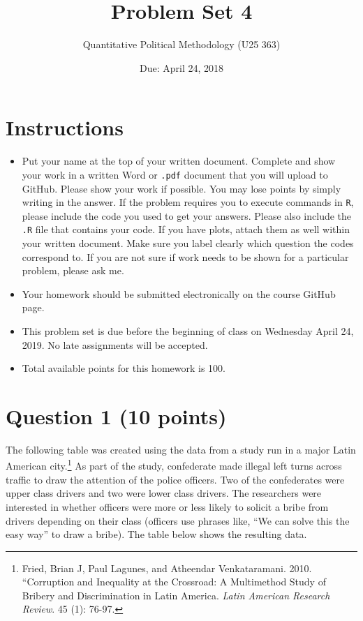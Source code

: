 \documentclass[12pt,letterpaper]{article}
\title{Problem Set 4}
\date{Due: April 24, 2018}
\author{Quantitative Political Methodology (U25 363)}
\begin{document}
	\maketitle
	
	
	\section*{Instructions}
	\begin{itemize}
			\item Put your name at the top of your written document. Complete and show your work in a written Word or \texttt{.pdf} document that you will upload to GitHub. Please show your work if possible. You may lose points by simply writing in the answer. If the problem requires you to execute commands in \texttt{R}, please include the code you used to get your answers. Please also include the \texttt{.R} file that contains your code. If you have plots, attach them as well within your written document. Make sure you label clearly which question the codes correspond to. If you are not sure if work needs to be shown for a particular problem, please ask me.
		\item Your homework should be submitted electronically on the course GitHub page.
		\item This problem set is due before the beginning of class on Wednesday April 24, 2019. No late assignments will be accepted.
		\item Total available points for this homework is 100.
	\end{itemize}



	\section*{Question 1 (10 points)}
	
	The following table was created using the data from a study run in a major Latin American city.\footnote{Fried, Brian J, Paul Lagunes, and Atheendar Venkataramani. 2010. ``Corruption and Inequality at the Crossroad: A Multimethod Study of Bribery and Discrimination in Latin America. \textit{Latin American Research Review}. 45 (1): 76-97.} As part of the study, confederate made illegal left turns across traffic to draw the attention of the police officers.  Two of the confederates were upper class drivers and two were lower class drivers.  The researchers were interested in whether officers were more or less likely to solicit a bribe from drivers depending on their class (officers use phrases like, ``We can solve this the easy way'' to draw a bribe).  The table below shows the resulting data.
	
\end{document}

